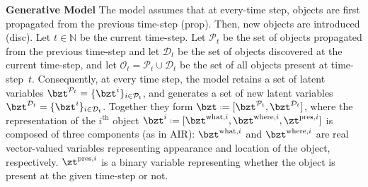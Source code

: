 \textbf{Generative Model}
The model assumes that at every-time step, objects are first propagated from the previous time-step (\gls{prop}). Then, new objects are introduced (\gls{disc}). 
Let $t \in \mathbb{N}$ be the current time-step.
Let $\mathcal{P}_t$ be the set of objects propagated from the previous time-step and let $\mathcal{D}_t$ be the set of objects discovered at the current time-step, and let $\mathcal{O}_t = \mathcal{P}_t \cup \mathcal{D}_t$ be the set of all objects present at time-step~$t$.
Consequently, at every time step, the model retains a set of latent variables $\bzt^{\mathcal{P}_t} = \{ \bzt^i \}_{i \in \mathcal{P}_t}$, and generates a set of new latent variables $\bzt^{\mathcal{D}_t} = \{ \bzt^i \}_{i \in \mathcal{D}_t}$. Together they form $\bzt \defeq [\bzt^{\mathcal{P}_t}, \bzt^{\mathcal{D}_t}]$, where the representation of the $i^\mathrm{th}$ object $\bzt^i \defeq [ \bzt^{\mathrm{what}, i}, \bzt^{\mathrm{where}, i}, \zt^{\mathrm{pres}, i}]$ is composed of three components (as in \gls{AIR}): 
$\bzt^{\mathrm{what},i}$ and $\bzt^{\mathrm{where},i}$ are real vector-valued variables representing appearance and location of the object, respectively. $\zt^{\mathrm{pres},i}$ is a binary variable representing whether the object is present at the given time-step or not.

